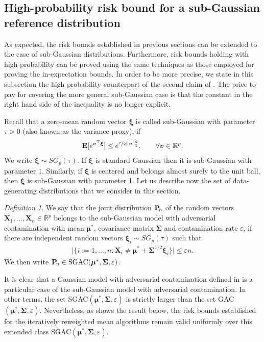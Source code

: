 \documentclass[aos,preprint,reqno]{imsart}
\newcommand\bmu{\boldsymbol\mu}
\newcommand\bxi{\boldsymbol\xi}
\newcommand\bSigma{\boldsymbol\Sigma}
\newcommand\bX{\boldsymbol X}
\newcommand\bv{\boldsymbol v}
\theoremstyle{plain}
\theoremstyle{remark}
\newtheorem{definition}{Definition}
\begin{document}
    \subsection{High-probability risk bound for a sub-Gaussian 
    reference distribution} 
    As expected, the risk bounds established in previous sections
    can be extended to the case of sub-Gaussian distributions.
    Furthermore, risk bounds holding with high-probability can be
    proved using the same techniques as those employed for
    proving the in-expectation bounds. In  order to be more
    precise, we state in this subsection the high-probability 
    counterpart of the second claim of . The price
    to pay for covering the more general sub-Gaussian case is
    that the constant in the right hand side of the inequality 
    is no longer explicit.
    
    Recall that a zero-mean random vector $\bxi$ is called 
    sub-Gaussian with parameter $\tau>0$ (also known as the 
    variance proxy), if
	\begin{align}
	    \mathbf E[e^{\bv^\top\bxi}] \le 
	    e^{\nicefrac{\tau}2 \|\bv\|_2^2},\qquad 
	    \forall \bv\in\mathbb R^p.
	\end{align}
	We write $\bxi \sim SG_p(\tau)$. If $\bxi$ is standard 
	Gaussian then it is sub-Gaussian with parameter $1$. 
	Similarly, if $\bxi$ is centered and belongs almost surely 
	to the unit ball, then $\bxi$ is sub-Gaussian with 
	parameter 1. Let us describe now the set of data-generating 
	distributions that we consider in this section. 
	
	\begin{definition}\label{def:SGAC}
	We say that the joint distribution $\mathbf P\!_n$ of the random 
	vectors $\bX_1,\ldots,\bX_n\in\mathbb{R}^p$ belongs to
	the sub-Gaussian model with adversarial contamination
	with mean $\bmu^*$, covariance matrix $\bSigma$ and 
	contamination rate $\varepsilon$, if there are independent
	random vectors $\bxi_i\sim SG_p(\tau)$ such that 
	\begin{align}
	    \Big|\Big\{i:=1,\ldots,n:\bX_i \neq \bmu^*+ \bSigma^{1/2}
	    \bxi_i\Big\}\Big|\le \varepsilon n.
	\end{align}
	We then write $\bfPn\in \textup{SGAC}(\bmu^*,\bSigma, 
	\varepsilon)$.
	\end{definition}
	
	It is clear that a Gaussian model with adversarial contamination
	defined in  is a particular case of the sub-Gaussian
	model with adversarial contamination. In other terms, the set
	\textup{SGAC}$(\bmu^*,\bSigma,\varepsilon)$ is strictly larger
	than the set \textup{GAC}$(\bmu^*,\bSigma,\varepsilon)$. 
	Nevertheless, as shows the result below, the risk bounds 
	established for the iteratively reweighted mean algorithms 
	remain valid uniformly over this extended class \textup{SGAC}$(\bmu^*,\bSigma,\varepsilon)$. 
	
\end{document}
